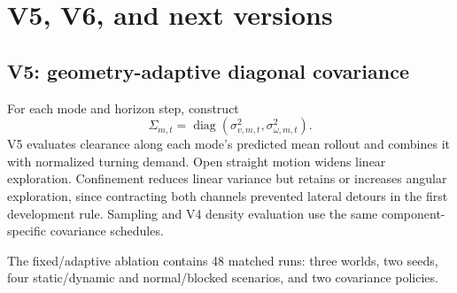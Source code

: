 \documentclass[11pt,a4paper]{article}
\begin{document}
\section{V5, V6, and next versions}

\subsection{V5: geometry-adaptive diagonal covariance}

For each mode and horizon step, construct
\begin{equation}
  \Sigma_{m,t} =
  \operatorname{diag}(\sigma^2_{v,m,t},\sigma^2_{\omega,m,t}).
\end{equation}
V5 evaluates clearance along each mode's predicted mean rollout and combines
it with normalized turning demand. Open straight motion widens linear
exploration. Confinement reduces linear variance but retains or increases
angular exploration, since contracting both channels prevented lateral
detours in the first development rule. Sampling and V4 density evaluation use
the same component-specific covariance schedules.

The fixed/adaptive ablation contains 48 matched runs: three worlds, two seeds,
four static/dynamic and normal/blocked scenarios, and two covariance policies.

\begin{table}[h]
\centering
{}
\caption{V5 fixed/adaptive covariance ablation. Times are means over
successful runs. The V5 dynamic-blocked failures are one collision and one
timeout; fixed covariance has two collisions.}
\label{tab:v5ablation}
\end{table}
\end{document}
